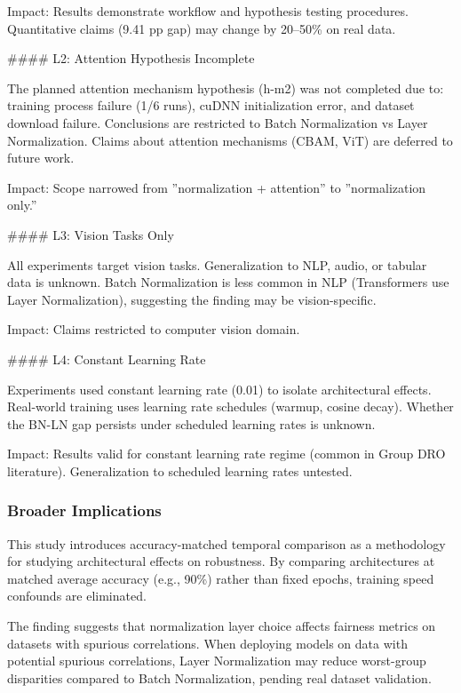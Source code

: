 Impact: Results demonstrate workflow and hypothesis testing procedures. Quantitative claims (9.41 pp gap) may change by 20--50\% on real data.

\#\#\#\# L2: Attention Hypothesis Incomplete

The planned attention mechanism hypothesis (h-m2) was not completed due to: training process failure (1/6 runs), cuDNN initialization error, and dataset download failure. Conclusions are restricted to Batch Normalization vs Layer Normalization. Claims about attention mechanisms (CBAM, ViT) are deferred to future work.

Impact: Scope narrowed from ''normalization + attention'' to ''normalization only.''

\#\#\#\# L3: Vision Tasks Only

All experiments target vision tasks. Generalization to NLP, audio, or tabular data is unknown. Batch Normalization is less common in NLP (Transformers use Layer Normalization), suggesting the finding may be vision-specific.

Impact: Claims restricted to computer vision domain.

\#\#\#\# L4: Constant Learning Rate

Experiments used constant learning rate (0.01) to isolate architectural effects. Real-world training uses learning rate schedules (warmup, cosine decay). Whether the BN-LN gap persists under scheduled learning rates is unknown.

Impact: Results valid for constant learning rate regime (common in Group DRO literature). Generalization to scheduled learning rates untested.

\subsubsection{Broader Implications}

This study introduces accuracy-matched temporal comparison as a methodology for studying architectural effects on robustness. By comparing architectures at matched average accuracy (e.g., 90\%) rather than fixed epochs, training speed confounds are eliminated.

The finding suggests that normalization layer choice affects fairness metrics on datasets with spurious correlations. When deploying models on data with potential spurious correlations, Layer Normalization may reduce worst-group disparities compared to Batch Normalization, pending real dataset validation.
